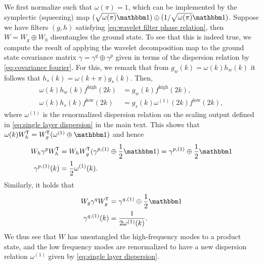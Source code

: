 \documentclass[submission, Phys]{SciPost}
\theoremstyle{definition}
\theoremstyle{remark}
\newcommand{\op}{\oplus}
\newcommand{\id}{\mathbbm 1}
\newcommand*{\tran}{{\mkern-1.5mu\mathsf{T}}}
\begin{document}
We first normalize such that $\omega(\pi) = 1$, which can be implemented by the symplectic (squeezing) map $(\sqrt{\omega(\pi)}\id) \op (1/\sqrt{\omega(\pi)}\id)$.
Suppose we have filters $(g,h)$ satisfying \cref{eq:wavelet filter phase relation}, then $W = W_g \op W_h$ disentangles the ground state.
To see that this is indeed true, we compute the result of applying the wavelet decomposition map to the ground state covariance matrix $\gamma = \gamma^q\op \gamma^p$ given in terms of the dispersion relation by \cref{eq:covariance fourier}.
For this, we remark that from $g_w(k) = \omega(k)h_w(k)$ it follows that $h_s(k) = \omega(k + \pi)g_s(k)$.
Then,
\begin{equation*}\begin{aligned}
  \omega(k)h_w(k)f^{\text{high}}(2k) &= g_w(k)f^{\text{high}}(2k), \\
  \omega(k)h_s(k)f^{\text{low}}(2k)
  &= g_s(k)\omega^{(1)}(2k)f^{\text{low}}(2k),
\end{aligned}\end{equation*}
where $\omega^{(1)}$ is the renormalized dispersion relation on the scaling output defined in \cref{eq:single layer dispersion} in the main text.
This shows that %
$\omega(k)W_h^{\tran} = W_g^{\tran}(\omega^{(1)} \op \id)$
and hence
\begin{equation*}\begin{aligned}
  W_h \gamma^p W_h^{\tran} &= W_h  W_g^{\tran} (\gamma^{p,(1)} \op \frac12\id) = \gamma^{p,(1)} \op \frac12\id \\
  \gamma^{p,(1)}(k) &= \frac12 \omega^{(1)}(k).
\end{aligned}\end{equation*}
Similarly, it holds that
\begin{equation*}\begin{aligned}
  W_g \gamma^q W_g^{\tran} &= \gamma^{q,(1)} \op \frac12\id \\
  \gamma^{q,(1)}(k) &= \frac{1}{2\omega^{(1)}(k)}.
\end{aligned}\end{equation*}
We thus see that $W$ has unentangled the high-frequency modes to a product state, and the low frequency modes are renormalized to have a new dispersion relation $\omega^{(1)}$ given by \cref{eq:single layer dispersion}.
\end{document}
